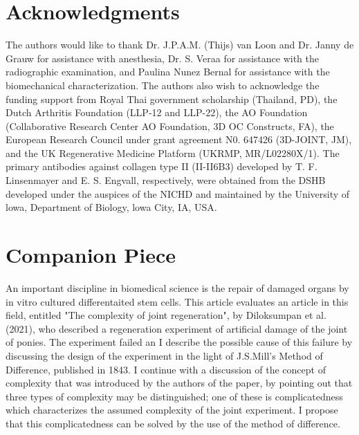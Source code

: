 \documentclass[twocolumn, serif, empirical, authordate, seplic]{jote-article}
\begin{document}
\setlength{\bibhang}{\parindent}

\printbibliography
{} {}\section*{Acknowledgments} 

The authors would like to thank Dr. J.P.A.M. (Thijs) van Loon and Dr. Janny de Grauw for assistance with anesthesia, Dr. S. Veraa for assistance with the radiographic examination, and Paulina Nunez Bernal for assistance with the biomechanical characterization. The authors also wish to acknowledge the funding support from Royal Thai government scholarship (Thailand, PD), the Dutch Arthritis Foundation (LLP-12 and LLP-22), the AO Foundation (Collaborative Research Center AO Foundation, 3D OC Constructs, FA), the European Research Council under grant agreement N0. 647426 (3D-JOINT, JM), and the UK Regenerative Medicine Platform (UKRMP, MR/L02280X/1). The primary antibodies against collagen type II (II-II6B3) developed by T. F. Linsenmayer and E. S. Engvall, respectively, were obtained from the DSHB developed under the auspices of the NICHD and maintained by the University of lowa, Department of Biology, lowa City, IA, USA.
 {}\section*{Companion Piece} 

\noindent An important discipline in biomedical science is the repair of damaged organs by in vitro cultured differentaited stem cells. This article evaluates an article in this field, entitled "The complexity of joint regeneration", by Diloksumpan et al. (2021), who described a regeneration experiment of artificial damage of the joint of ponies. The experiment failed an I describe the possible cause of this failure by discussing the design of the experiment in the light of J.S.Mill's Method of Difference, published in 1843. I continue with a discussion of the concept of complexity that was introduced by the authors of the paper, by pointing out that three types of complexity may be distinguished; one of these is complicatedness which characterizes the assumed complexity of the joint experiment. I propose that this complicatedness can be solved by the use of the method of difference.
    \newpage
\end{document}
